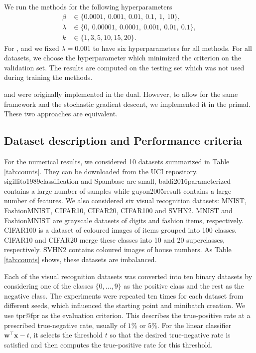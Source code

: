 We run the methods for the following hyperparameters
\begin{equation}\label{eq:beta1}
  \begin{aligned}
    \beta   & \in  \{0.0001,\ 0.001,\ 0.01,\ 0.1,\ 1,\ 10\}, \\
    \lambda & \in \{0,\ 0.00001,\ 0.0001,\ 0.001,\ 0.01,\ 0.1\}, \\
    k       & \in \{1, 3, 5, 10, 15, 20\}.
  \end{aligned}
\end{equation}
For \TopPushK, \PatMat and \PatMatNP we fixed $\lambda=0.001$ to have six hyperparameters for all methods. For all datasets, we choose the hyperparameter which minimized the criterion on the validation set. The results are computed on the testing set which was not used during training the methods.

\TopPush and \tauFPL were originally implemented in the dual. However, to allow for the same framework and the stochastic gradient descent, we implemented it in the primal. These two approaches are equivalent.

\subsection{Dataset description and Performance criteria}\label{sec:datasets}

For the numerical results, we considered 10 datasets summarized in Table \ref{tab:counts}. They can be downloaded from the UCI repository. sigillito1989classification \cite{sigillito1989classification} and Spambase are small, baldi2016parameterized \cite{baldi2016parameterized} contains a large number of samples while guyon2005result \cite{guyon2005result} contains a large number of features. We also considered six visual recognition datasets: MNIST, FashionMNIST, CIFAR10, CIFAR20, CIFAR100 and SVHN2. MNIST and FashionMNIST are grayscale datasets of digits and fashion items, respectively. CIFAR100 is a dataset of coloured images of items grouped into 100 classes. CIFAR10 and CIFAR20 merge these classes into 10 and 20 superclasses, respectively. SVHN2 contains coloured images of house numbers. As Table \ref{tab:counts} shows, these datasets are imbalanced.

Each of the visual recognition datasets was converted into ten binary datasets by considering one of the classes $\{0,\dots,9\}$ as the positive class and the rest as the negative class. The experiments were repeated ten times for each dataset from different seeds, which influenced the starting point and minibatch creation. We use tpr@fpr as the evaluation criterion. This describes the true-positive rate at a prescribed true-negative rate, usually of $1\%$ or $5\%$. For the linear classifier $\bm{w}^\top \bm{x} - t$, it selects the threshold $t$ so that the desired true-negative rate is satisfied and then computes the true-positive rate for this threshold.

